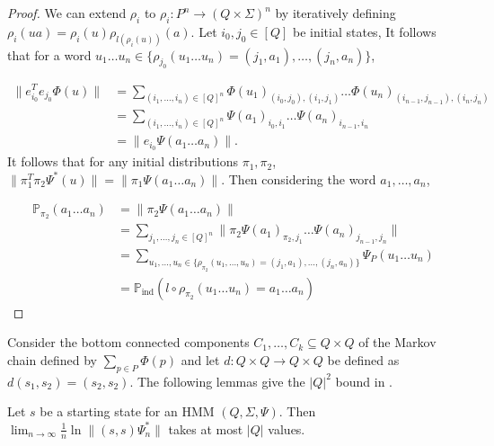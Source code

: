 \documentclass[a4paper,UKenglish,cleveref, autoref,mathscr]{lipics-v2019}
\newcommand{\PP}{\mathbb{P}}
\newcommand{\1}{\mathbbm{1}}
\begin{document}
\begin{proof}
We can extend $\rho_i$ to $\rho_i : P^n \rightarrow (Q \times \Sigma)^n$ by iteratively defining $\rho_i(ua) = \rho_i(u) \rho_{l(\rho_i(u))}(a)$. Let  $i_0, j_0 \in [Q]$ be initial states, It follows that for a word $u_1 \dots u_n \in \{\rho_{j_0}(u_1 \dots u_n) = (j_1, a_1), \dots, (j_n, a_n)\}$,

\begin{align*}
\| e_{i_0}^T e_{j_0} \Phi(u) \| & = \sum_{(i_1, \dots, i_n) \in [Q]^n} \Phi(u_1)_{(i_0, j_0),(i_1,j_1)} \dots \Phi(u_n)_{(i_{n - 1}, j_{n - 1}),(i_n,j_n)}\\
& = \sum_{(i_1, \dots, i_n) \in [Q]^n} \Psi(a_1)_{i_0, i_1} \dots \Psi(a_n)_{i_{n - 1}, i_n}\\
& = \| e_{i_0} \Psi(a_1 \dots a_n) \|.
\end{align*}
It follows that for any initial distributions $\pi_1, \pi_2$, $\| \pi_1^T \pi_2 \Psi^*(u) \| = \| \pi_1 \Psi(a_1 \dots a_n) \|$. Then considering the word $a_1, \dots, a_n$, 

\begin{align*}
\PP_{\pi_2}(a_1 \dots a_n) & =\|\pi_2\Psi(a_1 \dots a_n)\| \\
& = \sum_{j_1, \dots, j_n \in [Q]^n}\|\pi_2\Psi(a_1)_{\pi_2, j_1} \dots \Psi(a_n)_{j_{n - 1}, j_n}\|\\
& = \sum_{u_1, \dots, u_n \in \{\rho_{\pi_2}(u_1, \dots, u_n) = (j_1, a_1), \dots, (j_n, a_n)\}} \Psi_P(u_1 \dots u_n)\\
& = \PP_{\text{ind}}(l \circ \rho_{\pi_2}(u_1 \dots u_n) = a_1 \dots a_n)
\end{align*}
\end{proof}


Consider the bottom connected components $C_1, \dots, C_k \subseteq Q \times Q$ of the Markov chain defined by $\sum_{p \in P} \Phi(p)$ and let $d : Q \times Q \rightarrow Q \times Q$ be defined as $d(s_1, s_2) = (s_2, s_2)$. The following lemmas give the $|Q|^2$ bound in .

\begin{lemma}\label{Qboundfordenominator}
Let $s$ be a starting state for an HMM $(Q, \Sigma, \Psi)$. Then $\lim_{n \rightarrow \infty} \frac1n \ln \|  (s, s) \Psi_n^* \|$ takes at most $|Q|$ values.
\end{lemma}
\end{document}
